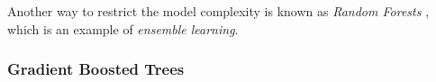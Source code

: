 





Another way to restrict the model complexity is known as \emph{Random Forests} \citep{breiman2001}, which is an example of \emph{ensemble learning}.



%

\subsubsection{Gradient Boosted Trees}